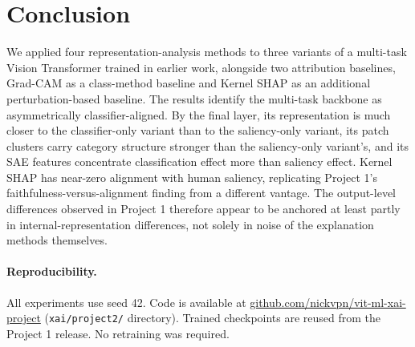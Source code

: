 \documentclass{article}
\begin{document}
\section{Conclusion}

We applied four representation-analysis methods to three variants of a multi-task Vision Transformer trained in earlier work, alongside two attribution baselines, Grad-CAM as a class-method baseline and Kernel SHAP as an additional perturbation-based baseline. The results identify the multi-task backbone as asymmetrically classifier-aligned. By the final layer, its representation is much closer to the classifier-only variant than to the saliency-only variant, its patch clusters carry category structure stronger than the saliency-only variant's, and its SAE features concentrate classification effect more than saliency effect. Kernel SHAP has near-zero alignment with human saliency, replicating Project 1's faithfulness-versus-alignment finding from a different vantage. The output-level differences observed in Project 1 therefore appear to be anchored at least partly in internal-representation differences, not solely in noise of the explanation methods themselves.

\paragraph{Reproducibility.}
All experiments use seed 42. Code is available at \href{https://github.com/nickvpn/vit-ml-xai-project}{github.com/nickvpn/vit-ml-xai-project} (\texttt{xai/project2/} directory). Trained checkpoints are reused from the Project 1 release. No retraining was required.
\end{document}
